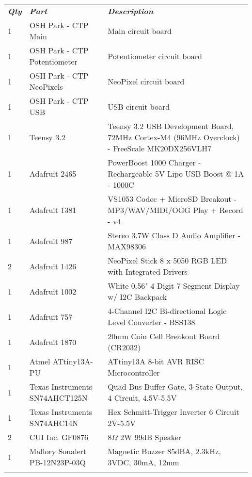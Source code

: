 \tiny
{}
\begin{longtabu}{X[1,c,m] X[6,c,m] X[9,l,m]}
  \thrule
  \textit{\bfseries\normalsize Qty} & \textit{\bfseries\normalsize Part} & \textit{\bfseries\normalsize Description} \\ \mrule

  1 & OSH Park - CTP Main & Main circuit board \\
  1 & OSH Park - CTP Potentiometer & Potentiometer circuit board \\
  1 & OSH Park - CTP NeoPixels & NeoPixel circuit board \\
  1 & OSH Park - CTP USB & USB circuit board \\ \mrule

  1 & Teensy 3.2 & Teensy 3.2 USB Development Board, 72MHz Cortex-M4 (96MHz Overclock) - FreeScale MK20DX256VLH7 \\
  1 & Adafruit 2465 & PowerBoost 1000 Charger - Rechargeable 5V Lipo USB Boost @ 1A - 1000C \\
  1 & Adafruit 1381 & VS1053 Codec + MicroSD Breakout - MP3/WAV/MIDI/OGG Play + Record - v4 \\
  1 & Adafruit 987 & Stereo 3.7W Class D Audio Amplifier - MAX98306 \\
  2 & Adafruit 1426 & NeoPixel Stick 8 x 5050 RGB LED with Integrated Drivers \\
  1 & Adafruit 1002 & White 0.56" 4-Digit 7-Segment Display w/ I2C Backpack \\
  1 & Adafruit 757 & 4-Channel I2C Bi-directional Logic Level Converter - BSS138 \\
  1 & Adafruit 1870 & 20mm Coin Cell Breakout Board (CR2032) \\ \mrule

  1 & Atmel ATtiny13A-PU & ATtiny13A 8-bit AVR RISC Microcontroller \\
  1 & Texas Instruments SN74AHCT125N & Quad Bus Buffer Gate, 3-State Output, 4 Circuit, 4.5V-5.5V \\
  1 & Texas Instruments SN74AHC14N & Hex Schmitt-Trigger Inverter 6 Circuit 2V-5.5V \\ \mrule

  2 & CUI Inc. GF0876 & 8$\Omega$ 2W 99dB Speaker \\
  1 & Mallory Sonalert PB-12N23P-03Q & Magnetic Buzzer 85dBA, 2.3kHz, 3VDC, 30mA, 12mm \\ \mrule


\end{longtabu}
